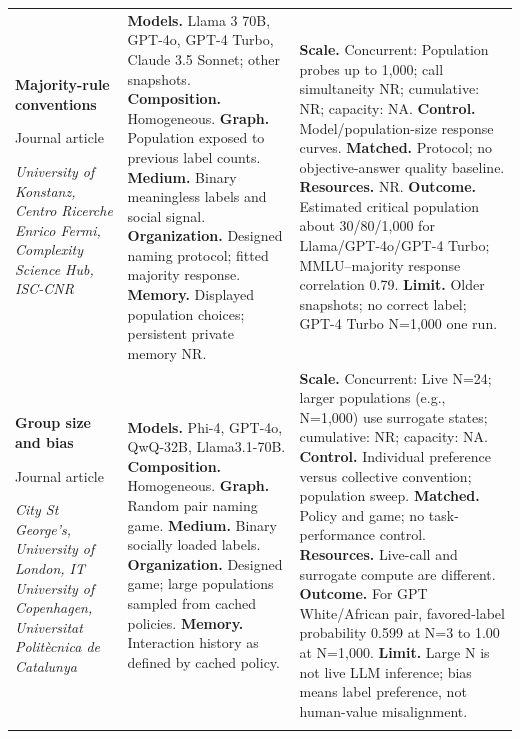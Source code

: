 \begin{longtable}{@{}>{\raggedright\arraybackslash}p{}>{\raggedright\arraybackslash}p{}>{\raggedright\arraybackslash}p{}@{}}
\textbf{Majority-rule conventions}\par \citep{prev-demarzo-majority}\par Journal article\par\emph{University of Konstanz, Centro Ricerche Enrico Fermi, Complexity Science Hub, ISC-CNR} & \textbf{Models.} Llama 3 70B, GPT-4o, GPT-4 Turbo, Claude 3.5 Sonnet; other snapshots. \textbf{Composition.} Homogeneous. \textbf{Graph.} Population exposed to previous label counts. \textbf{Medium.} Binary meaningless labels and social signal. \textbf{Organization.} Designed naming protocol; fitted majority response. \textbf{Memory.} Displayed population choices; persistent private memory NR. & \textbf{Scale.} Concurrent: Population probes up to 1,000; call simultaneity NR; cumulative: NR; capacity: NA. \textbf{Control.} Model/population-size response curves. \textbf{Matched.} Protocol; no objective-answer quality baseline. \textbf{Resources.} NR. \textbf{Outcome.} Estimated critical population about 30/80/1,000 for Llama/GPT-4o/GPT-4 Turbo; MMLU--majority response correlation 0.79. \textbf{Limit.} Older snapshots; no correct label; GPT-4 Turbo N=1,000 one run. \\ \addlinespace[5pt]
\textbf{Group size and bias}\par \citep{prev-flint-group-size}\par Journal article\par\emph{City St George’s, University of London, IT University of Copenhagen, Universitat Politècnica de Catalunya} & \textbf{Models.} Phi-4, GPT-4o, QwQ-32B, Llama3.1-70B. \textbf{Composition.} Homogeneous. \textbf{Graph.} Random pair naming game. \textbf{Medium.} Binary socially loaded labels. \textbf{Organization.} Designed game; large populations sampled from cached policies. \textbf{Memory.} Interaction history as defined by cached policy. & \textbf{Scale.} Concurrent: Live N=24; larger populations (e.g., N=1,000) use surrogate states; cumulative: NR; capacity: NA. \textbf{Control.} Individual preference versus collective convention; population sweep. \textbf{Matched.} Policy and game; no task-performance control. \textbf{Resources.} Live-call and surrogate compute are different. \textbf{Outcome.} For GPT White/African pair, favored-label probability 0.599 at N=3 to 1.00 at N=1,000. \textbf{Limit.} Large N is not live LLM inference; bias means label preference, not human-value misalignment. \\ \addlinespace[5pt]

\end{longtable}
